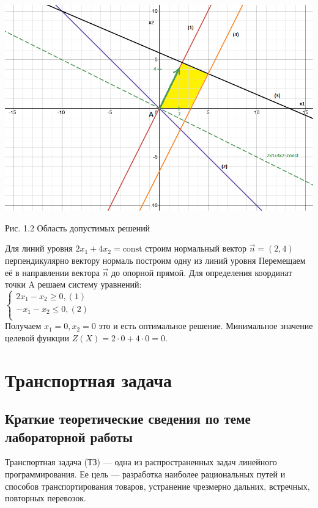\documentclass[a4paper, 12pt]{article}
\begin{document}
\includegraphics[width=\textwidth]{1-1.png}
\begin{center}
  Рис. 1.2 Область допустимых решений
\end{center}

Для линий уровня $2x_1+4x_2 = \text{const}$ строим нормальный вектор $\vec{n} = (2,4)$ перпендикулярно вектору нормаль построим одну из линий уровня Перемещаем её в направлении вектора $\vec{n}$ до опорной прямой. Для определения координат точки A решаем систему уравнений:\\

\begin{math}
  \begin{cases}
    2x_1-x_2 \geq 0,(1)\\
    -x_1-x_2 \leq 0,(2)\\
  \end{cases}
\end{math}\\

Получаем $x_1 = 0, x_2 = 0$ это и есть оптимальное решение. Минимальное значение целевой функции $Z(X) = 2 \cdot 0 + 4 \cdot 0 = 0$.
\newpage
\section{Транспортная задача}
\subsection{Краткие теоретические сведения по теме лабораторной работы}
Транспортная задача (ТЗ) — одна из распространенных задач линейного программирования. Ее цель — разработка наиболее рациональных путей и способов транспортирования товаров, устранение чрезмерно дальних, встречных, повторных перевозок. 
\end{document}
